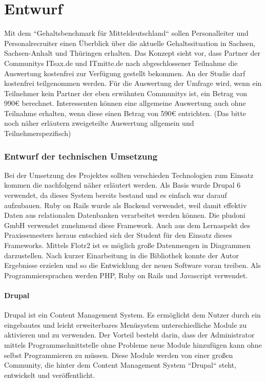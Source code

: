 \part{Entwurf}
Mit dem ``Gehaltsbenchmark für Mitteldeutschland`` sollen Personalleiter und Personalrecruiter einen Überblick über die aktuelle Gehaltssituation in Sachsen, Sachsen-Anhalt und Thüringen erhalten. 
Das Konzept sieht vor, dass Partner der Communitys ITsax.de und ITmitte.de nach abgeschlossener Teilnahme die Auswertung kostenfrei zur Verfügung gestellt bekommen. An der Studie darf kostenfrei teilgenommen werden. Für die Auswertung der Umfrage wird, wenn ein Teilnehmer kein Partner der eben erwähnten Communitys ist, ein Betrag von 990€ berechnet. 
Interessenten können eine allgemeine Auswertung auch ohne Teilnahme erhalten, wenn diese einen Betrag von 590€ entrichten. (Das bitte noch näher erläutern zweigeteilte Auswertung allgemein und Teilnehmerspezifisch)
\section{Entwurf der technischen Umsetzung}
Bei der Umsetzung des Projektes sollten verschieden Technologien zum Einsatz kommen die nachfolgend näher erläutert werden. Als Basis wurde Drupal 6 verwendet, da dieses System bereits bestand und es einfach war darauf aufzubauen. Ruby on Rails wurde als Backend verwendet, weil damit effektiv Daten aus relationalen Datenbanken verarbeitet werden können. Die pludoni GmbH verwendet zunehmend diese Framework. Auch aus dem Lernaspekt des Praxissemesters heraus entschied sich der Student für den Einsatz dieses Frameworks. Mittels Flotr2 ist es möglich große Datenmengen in Diagrammen darzustellen. Nach kurzer Einarbeitung in die Bibliothek konnte der Autor Ergebnisse erzielen und so die Entwicklung der neuen Software voran treiben. 
Als Programmiersprachen werden PHP, Ruby on Rails \cite{rails} und Javascript verwendet. 
\subsection{Drupal}
Drupal ist ein Content Management System. Es ermöglicht dem Nutzer durch ein eingebautes und leicht erweiterbares Menüsystem unterschiedliche Module zu aktivieren und zu verwenden. 
Der Vorteil besteht darin, dass der Administrator mittels Programmschnittstelle ohne Probleme neue Module hinzufügen kann ohne selbst Programmieren zu müssen. 
Diese Module werden von einer großen Community, die hinter dem Content Management System ``Drupal`` steht, entwickelt und veröffentlicht. %
